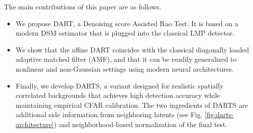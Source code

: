 \newpage
The main contributions of this paper are as follows.
\begin{itemize}
\item We propose DART, a Denoising score Assisted Rao Test. It is based on a
modern DSM estimator that is plugged into the classical LMP detector.
\item We show that the affine DART coincides with the classical diagonally loaded adaptive matched filter (AMF), and that it can be readily generalized to nonlinear and non-Gaussian settings using modern neural architectures.
\item Finally, we develop DARTS, a variant designed for realistic spatially correlated backgrounds that achieves high detection accuracy while maintaining empirical CFAR calibration. The two ingredients of DARTS are additional side information from neighboring latents (see Fig. \ref{fig:darts-architecture}) and neighborhood-based normalization of the final test.
\end{itemize}
